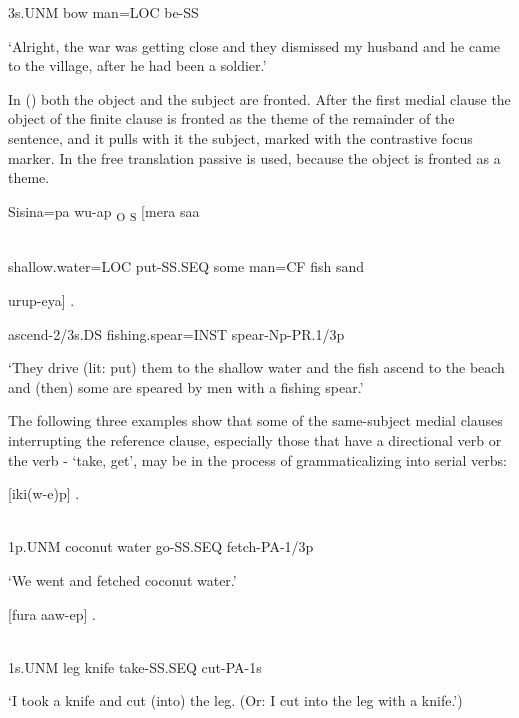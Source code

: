3s.UNM  bow  man=LOC  be-SS

`Alright, the war was getting close and they dismissed my husband and he came to the village, after he had been a soldier.'

In () both the object and the subject are fronted. After the first medial clause the object of the finite clause is fronted as the theme of the remainder of the sentence, and it pulls with it the subject, marked with the contrastive focus marker.  In the free translation passive is used, because the object is fronted as a theme.

\ea%
\label{ex:x1465}
\gll Sisina=pa  wu-ap  \textsubscript{O}  \textsubscript{S}  [mera  saa  \\
      \\
\glt
\z

shallow.water=LOC  put-SS.SEQ  some  man=CF  fish  sand

urup-eya]  .

ascend-2/3s.DS  fishing.spear=INST  spear-Np-PR.1/3p

`They drive (lit: put) them to the shallow water and the fish ascend to the beach and (then) some are speared by men with a fishing spear.' 

The following three examples show that some of the same-subject medial clauses interrupting the reference clause, especially those that have a directional verb or the verb - `take, get', may be in the process of grammaticalizing into serial verbs: 

\ea%
\label{ex:x1466}
\gll {}  [iki(w-e)p]  . \\
      \\
\glt
\z

1p.UNM  coconut  water  go-SS.SEQ  fetch-PA-1/3p

`We went and fetched coconut water.'

\ea%
\label{ex:x1467}
\gll {}  [fura  aaw-ep]  . \\
      \\
\glt
\z

1s.UNM  leg  knife  take-SS.SEQ  cut-PA-1s

`I took a knife and cut (into) the leg. (Or: I cut into the leg with a knife.')

